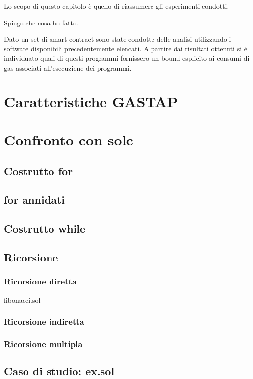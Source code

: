 
Lo scopo di questo capitolo è quello di riassumere gli esperimenti condotti.\newline

Spiego che cosa ho fatto.

Dato un set di smart contract sono state condotte delle analisi utilizzando i software disponibili precedentemente elencati. A partire dai risultati ottenuti si è individuato quali di questi programmi fornissero un bound esplicito ai consumi di gas associati all'esecuzione dei programmi.\newline

\section{Caratteristiche GASTAP}

\section{Confronto con solc}

    \subsection{Costrutto for}
    
    \subsection{for annidati}

    \subsection{Costrutto while}

    \subsection{Ricorsione}

        \subsubsection{Ricorsione diretta}
        fibonacci.sol

        \subsubsection{Ricorsione indiretta}
        
        \subsubsection{Ricorsione multipla}

    \subsection{Caso di studio: ex.sol}
